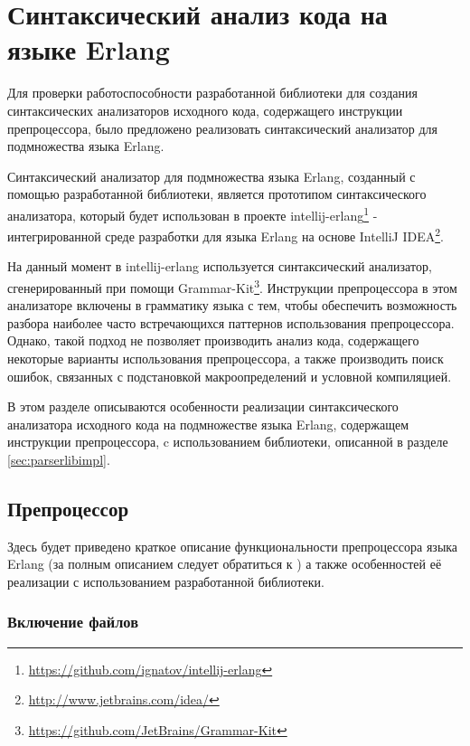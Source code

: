 \clearpage

\section{Синтаксический анализ кода на языке Erlang}

Для проверки работоспособности разработанной библиотеки для создания синтаксических анализаторов исходного кода, содержащего инструкции препроцессора, было предложено реализовать синтаксический анализатор для подмножества языка Erlang. 

Синтаксический анализатор для подмножества языка Erlang, созданный с помощью разработанной библиотеки, является прототипом синтаксического анализатора, который будет использован в проекте intellij-erlang\footnote{\url{https://github.com/ignatov/intellij-erlang}} - интегрированной среде разработки для языка Erlang на основе IntelliJ IDEA\footnote{\url{http://www.jetbrains.com/idea/}}.

На данный момент в intellij-erlang используется синтаксический анализатор, сгенерированный при помощи Grammar-Kit\footnote{\url{https://github.com/JetBrains/Grammar-Kit}}. Инструкции препроцессора в этом анализаторе включены в грамматику языка с тем, чтобы обеспечить возможность разбора наиболее часто встречающихся паттернов использования препроцессора. Однако, такой подход не позволяет производить анализ кода, содержащего некоторые варианты использования препроцессора, а также производить поиск ошибок, связанных с подстановкой макроопределений и условной компиляцией. 

В этом разделе описываются особенности реализации синтаксического анализатора исходного кода на подмножестве языка Erlang, содержащем инструкции препроцессора, c использованием библиотеки, описанной в разделе \ref{sec:parserlibimpl}.

\subsection{Препроцессор}

Здесь будет приведено краткое описание функциональности препроцессора языка Erlang (за полным описанием следует обратиться к \cite{erlangpreprocessor}) а также особенностей её реализации с использованием разработанной библиотеки.

\subsubsection{Включение файлов}

